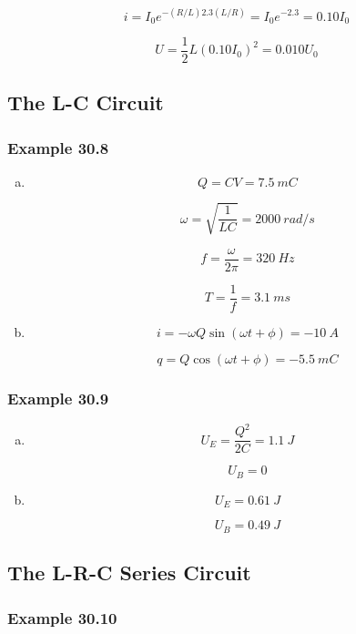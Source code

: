 \documentclass{article}
\begin{document}
\[i = I_0 e^{-(R / L) 2.3 (L / R)} = I_0 e^{-2.3} = 0.10 I_0\]

\[U = \frac{1}{2} L (0.10 I_0)^2 = 0.010 U_0\]

\subsection{The L-C Circuit}

\subsubsection{Example 30.8}

\begin{enumerate}[(a)]
  \item

        \[Q = C V = \qty{7.5}{mC}\]

        \[\omega = \sqrt{\frac{1}{L C}} = \qty{2000}{rad/s}\]

        \[f = \frac{\omega}{2 \pi} = \qty{320}{Hz}\]

        \[T = \frac{1}{f} = \qty{3.1}{ms}\]

  \item

        \[i = -\omega Q \sin (\omega t + \phi) = \qty{-10}{A}\]

        \[q = Q \cos (\omega t + \phi) = \qty{-5.5}{mC}\]
\end{enumerate}

\subsubsection{Example 30.9}

\begin{enumerate}[(a)]
  \item

        \[U_E = \frac{Q^2}{2 C} = \qty{1.1}{J}\]

        \[U_B = 0\]

  \item

        \[U_E = \qty{0.61}{J}\]

        \[U_B = \qty{0.49}{J}\]
\end{enumerate}

\subsection{The L-R-C Series Circuit}

\subsubsection{Example 30.10}
\end{document}
